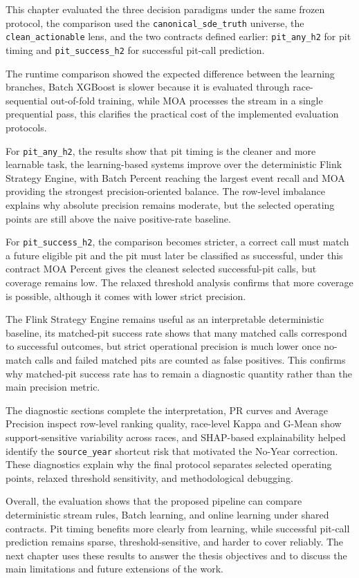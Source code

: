 This chapter evaluated the three decision paradigms under the same frozen protocol, the comparison used the \texttt{canonical\_sde\_truth} universe, the 
\texttt{clean\_actionable} lens, and the two contracts defined earlier: \texttt{pit\_any\_h2} for pit timing and \texttt{pit\_success\_h2} for successful pit-call prediction.

The runtime comparison showed the expected difference between the learning branches, Batch XGBoost is slower because it is evaluated through race-sequential 
out-of-fold training, while MOA processes the stream in a single prequential pass, this clarifies the practical cost of the implemented evaluation protocols.

For \texttt{pit\_any\_h2}, the results show that pit timing is the cleaner and more learnable task, the learning-based systems improve over the deterministic Flink 
Strategy Engine, with Batch Percent reaching the largest event recall and MOA providing the strongest precision-oriented balance. The row-level imbalance explains 
why absolute precision remains moderate, but the selected operating points are still above the naive positive-rate baseline.

For \texttt{pit\_success\_h2}, the comparison becomes stricter, a correct call must match a future eligible pit and the pit must later be classified as successful, under 
this contract MOA Percent gives the cleanest selected successful-pit calls, but coverage remains low. The relaxed threshold analysis confirms that more coverage is possible, 
although it comes with lower strict precision.

The Flink Strategy Engine remains useful as an interpretable deterministic baseline, its matched-pit success rate shows that many matched calls correspond to successful outcomes, 
but strict operational precision is much lower once no-match calls and failed matched pits are counted as false positives. This confirms why matched-pit success rate has to remain 
a diagnostic quantity rather than the main precision metric.

The diagnostic sections complete the interpretation, PR curves and Average Precision inspect row-level ranking quality, race-level Kappa and G-Mean show support-sensitive 
variability across races, and SHAP-based explainability helped identify the \texttt{source\_year} shortcut risk that motivated the No-Year correction. These diagnostics
 explain why the final protocol separates selected operating points, relaxed threshold sensitivity, and methodological debugging.

Overall, the evaluation shows that the proposed pipeline can compare deterministic stream rules, Batch learning, and online learning under shared contracts. Pit timing benefits 
more clearly from learning, while successful pit-call prediction remains sparse, threshold-sensitive, and harder to cover reliably. The next chapter uses these results to 
answer the thesis objectives and to discuss the main limitations and future extensions of the work.
